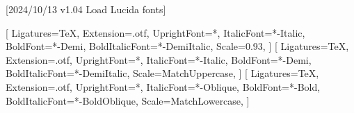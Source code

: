 
[2024/10/13 v1.04 Load Lucida fonts]



\ifpdftex
	\RequirePackage[LY1]{fontenc}
	\RequirePackage{bm}
\else
    \RequirePackage[warnings-off={mathtools-colon,mathtools-overbracket}]{unicode-math}

    
    \setmainfont{LucidaBrightOT}[%
          Ligatures=TeX,
          Extension=.otf,
          UprightFont=*,
          ItalicFont=*-Italic,
          BoldFont=*-Demi,
    	  BoldItalicFont=*-DemiItalic,
    	  Scale=0.93,%
      ]
    \setsansfont{LucidaSansOT}[%
          Ligatures=TeX,
          Extension=.otf,
          UprightFont=*,
          ItalicFont=*-Italic,
          BoldFont=*-Demi,
    	  BoldItalicFont=*-DemiItalic,
    	  Scale=MatchUppercase,
      ]
    \setmonofont{LucidaSansTypewriterOT}[%
          Ligatures=TeX,
          Extension=.otf,
          UprightFont=*,
          ItalicFont=*-Oblique,
          BoldFont=*-Bold,
          BoldItalicFont=*-BoldOblique,
          Scale=MatchLowercase,%
      ]
    
